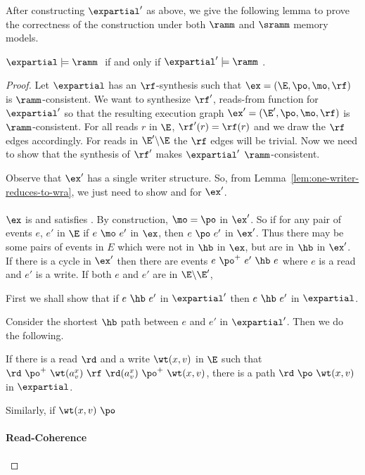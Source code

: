 After constructing $\expartial'$ as above, we   give the following lemma to prove the correctness of the construction under both $\ramm$ and $\sramm$ memory models. 

\begin{lemma}
 $\expartial\models \ramm~   $ if and only if $\expartial' \models \ramm~  $. 
\end{lemma}
\begin{proof}
 Let $\expartial$ has an $\rf$-synthesis such that $\ex=(\E, \po, \mo, \rf)$ is $\ramm$-consistent. We want to synthesize $\rf'$, reads-from function for $\expartial'$ so that the resulting execution graph $\ex'=(\E', \po, \mo, \rf)$ is $\ramm$-consistent. For all reads $r$ in $\E$, $\rf'(r)=\rf(r)$ and we draw the $\rf$ edges accordingly. For reads in $\E' \backslash \E$ the $\rf$ edges will be trivial. Now we need to show that the synthesis of $\rf'$ makes $\expartial'$ $\ramm$-consistent.
 
 Observe that $\ex'$ has a single writer structure. So, from Lemma~\ref{lem:one-writer-reduces-to-wra}, we just need to show \PORF{} and \WRCoh{} for $\ex'$. 
 
 \paragraph*{\PORF{}} 
$\ex$ is \PORF{} and satisfies \WCoh{}. By construction, $\mo=\po$ in $\ex'$. So if for any pair of events $e$, $e'$ in $\E$ if $e~\mo~e'$ in $\ex$, then $e~\po~e'$ in $\ex'$. Thus there may be some pairs of events in $E$ which were not in $\hb$ in $\ex$, but are in $\hb$ in $\ex'$. If there is a cycle in $\ex'$ then there are events $e~\po^+~e'~\hb~e$ where $e$ is a read and $e'$ is a write. If both $e$ and $e'$ are in $\E\backslash \E'$, 


 First we shall show that if $e~\hb~e'$ in $\expartial'$ then $e~\hb~e'$ in $\expartial$.
 
 Consider the shortest $\hb$ path between $e$ and $e'$ in $\expartial'$. Then we do the following.
 
 If there is a read $\rd$ and a write $\wt(x,v)$ in $\E$ such that $\rd~\po^+~\wt(a^x_v)~\rf~\rd(a^x_v)~\po^+~\wt(x,v)$, there is a path $\rd~\po~\wt(x,v)$ in $\expartial$.
 
 Similarly, if $\wt(x,v)~\po~$
 
 \paragraph*{Read-Coherence}
 

\end{proof}
